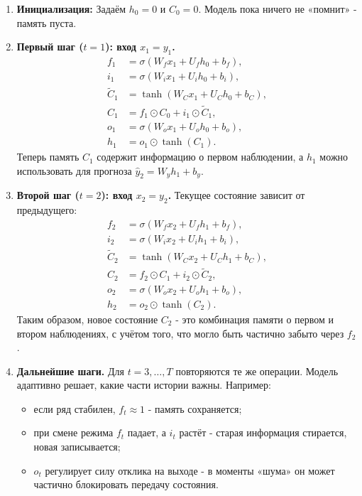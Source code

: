 \documentclass[12pt,a4paper]{article}
\begin{document}
\begin{enumerate}
  \item \textbf{Инициализация:}
  Задаём $h_0 = 0$ и $C_0 = 0$.
  Модель пока ничего не «помнит» - память пуста.

  \item \textbf{Первый шаг ($t=1$): вход $x_1=y_1$.}
  \begin{align*}
  f_1 &= \sigma(W_f x_1 + U_f h_0 + b_f),\\
  i_1 &= \sigma(W_i x_1 + U_i h_0 + b_i),\\
  \tilde{C}_1 &= \tanh(W_C x_1 + U_C h_0 + b_C),\\
  C_1 &= f_1 \odot C_0 + i_1 \odot \tilde{C}_1,\\
  o_1 &= \sigma(W_o x_1 + U_o h_0 + b_o),\\
  h_1 &= o_1 \odot \tanh(C_1).
  \end{align*}
  Теперь память \(C_1\) содержит информацию о первом наблюдении, а $h_1$ можно использовать для прогноза $\hat{y}_2 = W_y h_1 + b_y$.

  \item \textbf{Второй шаг ($t=2$): вход $x_2=y_2$.}
  Текущее состояние зависит от предыдущего:
  \begin{align*}
  f_2 &= \sigma(W_f x_2 + U_f h_1 + b_f),\\
  i_2 &= \sigma(W_i x_2 + U_i h_1 + b_i),\\
  \tilde{C}_2 &= \tanh(W_C x_2 + U_C h_1 + b_C),\\
  C_2 &= f_2 \odot C_1 + i_2 \odot \tilde{C}_2,\\
  o_2 &= \sigma(W_o x_2 + U_o h_1 + b_o),\\
  h_2 &= o_2 \odot \tanh(C_2).
  \end{align*}
  Таким образом, новое состояние \(C_2\) - это комбинация памяти о первом и втором наблюдениях, с учётом того, что могло быть частично забыто через \(f_2\).

  \item \textbf{Дальнейшие шаги.}
  Для $t=3,\dots,T$ повторяются те же операции.
  Модель адаптивно решает, какие части истории важны. Например:
  \begin{itemize}
    \item если ряд стабилен, $f_t \approx 1$ - память сохраняется;
    \item при смене режима $f_t$ падает, а $i_t$ растёт - старая информация стирается, новая записывается;
    \item $o_t$ регулирует силу отклика на выходе - в моменты «шума» он может частично блокировать передачу состояния.
  \end{itemize}
\end{enumerate}
\end{document}

